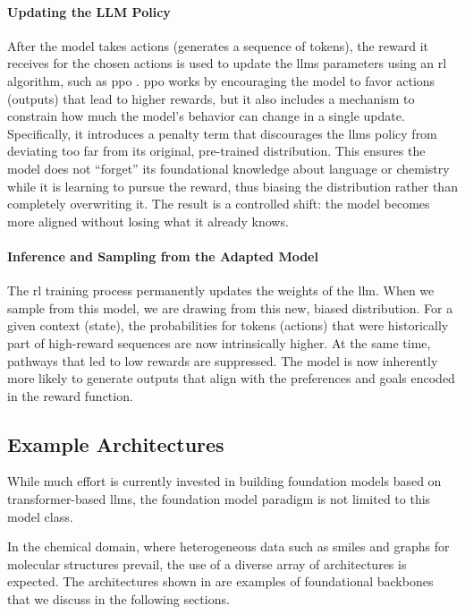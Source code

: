 \paragraph{Updating the LLM Policy} 
After the model takes actions (generates a sequence of tokens), the reward it receives for the chosen actions is used to update the \glspl{llm} parameters using an \gls{rl} algorithm, such as \gls{ppo} \autocite{schulman2017proximal}.
\gls{ppo} works by encouraging the model to favor actions (outputs) that lead to higher rewards, but it also includes a mechanism to constrain how much the model's behavior can change in a single update. 
Specifically, it introduces a penalty term that discourages the \glspl{llm} policy from deviating too far from its original, pre-trained distribution. 
This ensures the model does not \enquote{forget} its foundational knowledge about language or chemistry while it is learning to pursue the reward, thus biasing the distribution rather than completely overwriting it. 
The result is a controlled shift: the model becomes more aligned without losing what it already knows.


\paragraph{Inference and Sampling from the Adapted Model}

The \gls{rl} training process permanently updates the weights of the \gls{llm}. 
When we sample from this model, we are drawing from this new, biased distribution. 
For a given context (state), the probabilities for tokens (actions) that were historically part of high-reward sequences are now intrinsically higher. 
At the same time, pathways that led to low rewards are suppressed. 
The model is now inherently more likely to generate outputs that align with the preferences and goals encoded in the reward function.

\subsection{Example Architectures} \label{sec:example_architectures}
While much effort is currently invested in building foundation models based on transformer-based \glspl{llm}, the foundation model paradigm is not limited to this model class.

In the chemical domain, where heterogeneous data such as \gls{smiles} and graphs for molecular structures prevail, the use of a diverse array of architectures is expected.
The architectures shown in  are examples of foundational backbones that we discuss in the following sections.

